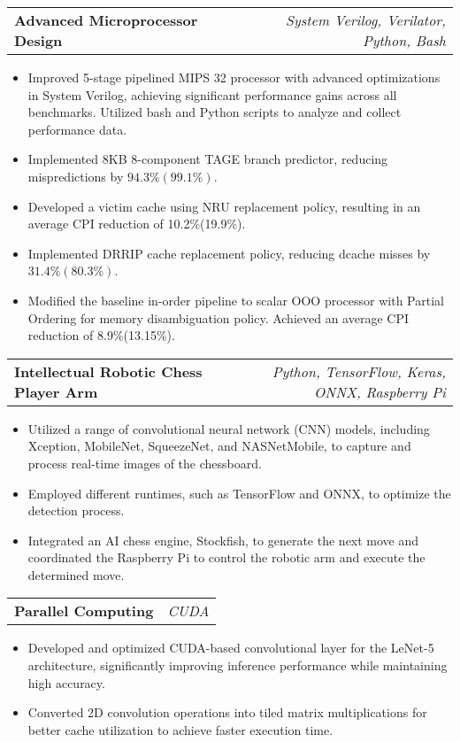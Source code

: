\documentclass[letterpaper,11pt]{article}
\makeatletter
\newcommand{\resumeItem}[1]{
  \item\small{
    {#1 \vspace{-2pt}}
  }
}
\newcommand{\resumeProjectHeading}[2]{
    \vspace{-2pt}\item
    \begin{tabular*}{0.97\textwidth}{l@{\extracolsep{\fill}}r}
      \textcolor{secondary_color}{\textbf{#1}} & \textcolor{secondary_color}{\textit{\small #2}} \\
    \end{tabular*}\vspace{-7pt}
}
\newcommand{\resumeItemListStart}{\begin{itemize}}
\newcommand{\resumeItemListEnd}{\end{itemize}\vspace{-5pt}}
\makeatother
\begin{document}
      \resumeProjectHeading
      {\textbf{Advanced Microprocessor Design}}{System Verilog, Verilator, Python, Bash}
        \resumeItemListStart
          \resumeItem{Improved 5-stage pipelined MIPS 32 processor with advanced optimizations in System Verilog, achieving significant performance gains across all benchmarks. Utilized bash and Python scripts to analyze and collect performance data.}
          \resumeItem{Implemented 8KB 8-component TAGE branch predictor, reducing mispredictions by \(94.3\%(99.1\%)\).}
          \resumeItem{Developed a victim cache using NRU replacement policy, resulting in an average CPI reduction of 10.2\%(19.9\%).}
          \resumeItem{Implemented DRRIP cache replacement policy, reducing dcache misses by \(31.4\%(80.3\%)\).}
          \resumeItem{Modified the baseline in-order pipeline to scalar OOO processor with Partial Ordering for memory disambiguation policy. Achieved an average CPI reduction of 8.9\%(13.15\%).}
        \resumeItemListEnd

      \resumeProjectHeading
        {\textbf{Intellectual Robotic Chess Player Arm}}{Python, TensorFlow, Keras, ONNX, Raspberry Pi}
          \resumeItemListStart
            \resumeItem{Utilized a range of convolutional neural network (CNN) models, including Xception, MobileNet, SqueezeNet, and NASNetMobile, to capture and process real-time images of the chessboard.}
            \resumeItem{Employed different runtimes, such as TensorFlow and ONNX, to optimize the detection process.}
            \resumeItem{Integrated an AI chess engine, Stockfish, to generate the next move and coordinated the Raspberry Pi to control the robotic arm and execute the determined move.}
          \resumeItemListEnd

      \resumeProjectHeading
        {\textbf{Parallel Computing}}{CUDA}
          \resumeItemListStart
            \resumeItem{Developed and optimized CUDA-based convolutional layer for the LeNet-5 architecture, significantly improving inference performance while maintaining high accuracy.}
            \resumeItem{Converted 2D convolution operations into tiled matrix multiplications for better cache utilization to achieve faster execution time.}
          \resumeItemListEnd
\end{document}
